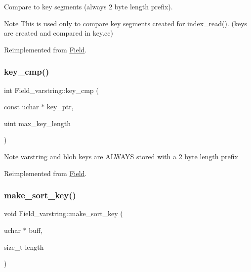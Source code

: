 Compare to key segments (always 2 byte length prefix).

\begin{DoxyNote}{Note}
This is used only to compare key segments created for index\+\_\+read(). (keys are created and compared in key.\+cc) 
\end{DoxyNote}


Reimplemented from \mbox{\hyperlink{classField}{Field}}.

\mbox{\label{classField__varstring_a2308fc04011a49463f722e17c1d99a8d}} 
\subsubsection{\texorpdfstring{key\+\_\+cmp()}{key\_cmp()}\hspace{0.1cm}{\footnotesize\ttfamily [2/2]}}
{\footnotesize\ttfamily int Field\+\_\+varstring\+::key\+\_\+cmp (\begin{DoxyParamCaption}\item[{const uchar $\ast$}]{key\+\_\+ptr,  }\item[{uint}]{max\+\_\+key\+\_\+length }\end{DoxyParamCaption})\hspace{0.3cm}{\ttfamily [virtual]}}

\begin{DoxyNote}{Note}
varstring and blob keys are A\+L\+W\+A\+YS stored with a 2 byte length prefix 
\end{DoxyNote}


Reimplemented from \mbox{\hyperlink{classField}{Field}}.

\mbox{\label{classField__varstring_a81d36d340a833e387cea487a157a5762}} 
\subsubsection{\texorpdfstring{make\+\_\+sort\+\_\+key()}{make\_sort\_key()}}
{\footnotesize\ttfamily void Field\+\_\+varstring\+::make\+\_\+sort\+\_\+key (\begin{DoxyParamCaption}\item[{uchar $\ast$}]{buff,  }\item[{size\+\_\+t}]{length }\end{DoxyParamCaption})\hspace{0.3cm}{\ttfamily [virtual]}}

